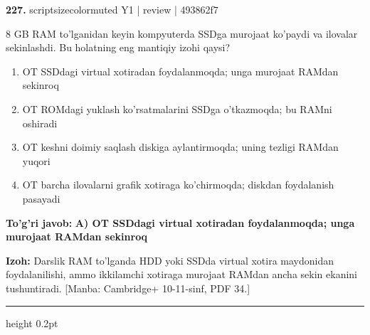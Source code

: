 \documentclass[10pt,a4paper]{article}
\begin{document}
{\bfseries\sffamily\color{ink} 227.} {scriptsizecolor{muted} Y1 | review | 493862f7}
\par
8 GB RAM to'lganidan keyin kompyuterda SSDga murojaat ko'paydi va ilovalar sekinlashdi. Bu holatning eng mantiqiy izohi qaysi?
\begin{enumerate}[label=\Alph*),leftmargin=9mm]
\item OT SSDdagi virtual xotiradan foydalanmoqda; unga murojaat RAMdan sekinroq
\item OT ROMdagi yuklash ko'rsatmalarini SSDga o'tkazmoqda; bu RAMni oshiradi
\item OT keshni doimiy saqlash diskiga aylantirmoqda; uning tezligi RAMdan yuqori
\item OT barcha ilovalarni grafik xotiraga ko'chirmoqda; diskdan foydalanish pasayadi
\end{enumerate}
\begin{tcolorbox}[enhanced,breakable,colback=teal!4,colframe=teal!60!black,boxrule=0.45pt,arc=1.2mm,left=2.7mm,right=2.7mm,top=1.8mm,bottom=1.8mm,before skip=2mm,after skip=2mm]
{\bfseries\sffamily\color{teal}To'g'ri javob:} \textbf{A) OT SSDdagi virtual xotiradan foydalanmoqda; unga murojaat RAMdan sekinroq}
\par\smallskip
{\bfseries Izoh:} Darslik RAM to'lganda HDD yoki SSDda virtual xotira maydonidan foydalanilishi, ammo ikkilamchi xotiraga murojaat RAMdan ancha sekin ekanini tushuntiradi. [Manba: Cambridge+ 10-11-sinf, PDF 34.]
\end{tcolorbox}
\vspace{2mm}\hrule height 0.2pt\vspace{3mm}
\end{document}
